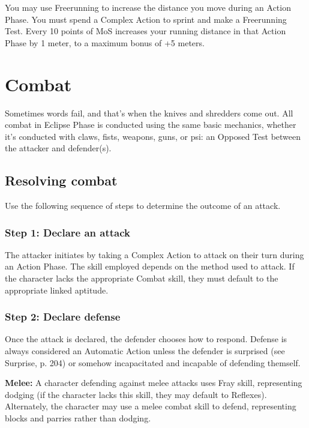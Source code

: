 You may use Freerunning to increase the distance you move during an Action Phase. You must spend a Complex Action to sprint and make a Freerunning Test. Every 10 points of MoS increases your running distance in that Action Phase by 1 meter, to a maximum bonus of +5 meters. 



\section{Combat} \label{sec:combat} 

Sometimes words fail, and that’s when the knives and shredders come out. All combat in Eclipse Phase is conducted using the same basic mechanics, whether it’s conducted with claws, fists, weapons, guns, or psi: an Opposed Test between the attacker and defender(s). 

\subsection{Resolving combat} 

Use the following sequence of steps to determine the outcome of an attack. 

\subsubsection{Step 1: Declare an attack} 

The attacker initiates by taking a Complex Action to attack on their turn during an Action Phase. The skill employed depends on the method used to attack. If the character lacks the appropriate Combat skill, they must default to the appropriate linked aptitude. 

\subsubsection{Step 2: Declare defense} 

Once the attack is declared, the defender chooses how to respond. Defense is always considered an Automatic Action unless the defender is surprised (see Surprise, p. 204) or somehow incapacitated and incapable of defending themself. 

\textbf{Melee:} A character defending against melee attacks uses Fray skill, representing dodging (if the character lacks this skill, they may default to Reflexes). Alternately, the character may use a melee combat skill to defend, representing blocks and parries rather than dodging. 

